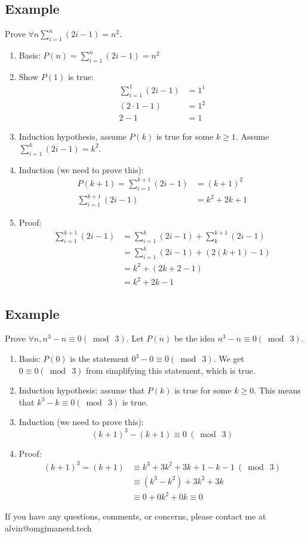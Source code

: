 \documentclass[letterpaper, 12pt]{math}
\begin{document}
\subsection*{Example}
Prove \( \forall{n}\sum_{i=1}^{n}(2i-1) = n^{2} \).
\begin{enumerate}
  \item Basis: \( P(n) = \sum_{i=1}^{n}(2i-1) = n^{2} \)
  \item Show \( P(1) \) is true:
    \begin{align*}
      \sum_{i=1}^{1}(2i-1) &= 1^{1} \\
      (2\cdot1-1) &= 1^{2} \\
      2-1 &= 1
    \end{align*}
  \item Induction hypothesis, assume \( P(k) \) is true for some \( k\geq 1 \).
    Assume \( \sum_{i=1}^{k}(2i-1) = k^{2} \).
  \item Induction (we need to prove this):
    \begin{align*}
      P(k+1) = \sum_{i=1}^{k+1}(2i-1) &= (k+1)^{2} \\
      \sum_{i=1}^{k+1}(2i-1) &= k^{2}+2k+1
    \end{align*}
  \item Proof:
    \begin{align*}
      \sum_{i=1}^{k+1}(2i-1) &= \sum_{i=1}^{k}(2i-1)+\sum_{k}^{k+1}(2i-1) \\
      &= \sum_{i=1}^{k}(2i-1)+(2(k+1)-1) \\
      &= k^{2}+(2k+2-1) \\
      &= k^{2}+2k-1
    \end{align*}
\end{enumerate}

\subsection*{Example}
Prove \( \forall{n}, n^{3}-n \equiv 0 (\bmod\ 3) \). Let \( P(n) \) be the idea
\( n^{3}-n \equiv 0 (\bmod\ 3) \).
\begin{enumerate}
  \item Basis: \( P(0) \) is the statement \( 0^{3}-0 \equiv 0 (\bmod\ 3) \).
    We get \( 0 \equiv 0(\bmod\ 3) \) from simplifying this statement, which is
    true.
  \item Induction hypothesis: assume that \( P(k) \) is true for some
    \( k\geq0 \). This means that \( k^{3}-k \equiv 0(\bmod\ 3) \) is true.
  \item Induction (we need to prove this):
    \[ (k+1)^{3}-(k+1) \equiv 0\ (\bmod\ 3) \]
  \item Proof:
    \begin{align*}
      (k+1)^{3}=(k+1) &\equiv k^{3}+3k^{2}+3k+1-k-1\ (\bmod\ 3) \\
      &\equiv (k^{3}-k^{2})+3k^{2}+3k \\
      &\equiv 0+0k^{2}+0k \equiv 0
    \end{align*}
\end{enumerate}

\begin{center}
  If you have any questions, comments, or concerns, please contact me at
  alvin@omgimanerd.tech
\end{center}
\end{document}
